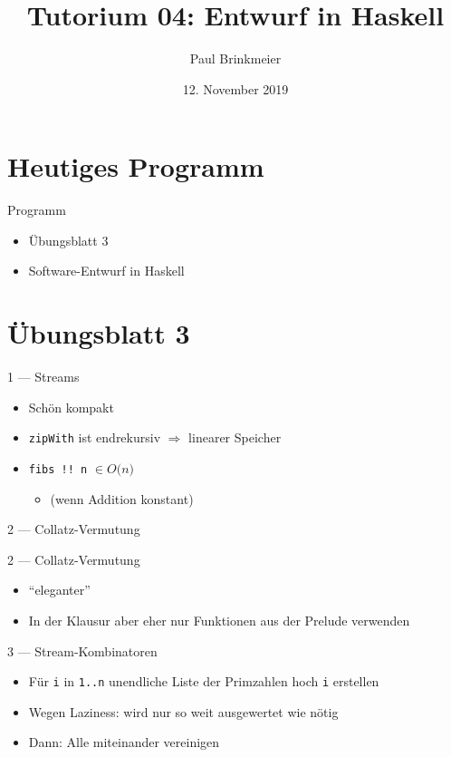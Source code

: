 \documentclass{beamer}
\title{Tutorium 04: Entwurf in Haskell}
\author{Paul Brinkmeier}
\institute{Tutorium Programmierparadigmen am KIT}
\date{12. November 2019}
\newcommand{\code}[1]{
	\begin{mdframed}
		
	\end{mdframed}
}
\begin{document}
\begin{frame}
	\titlepage
\end{frame}

\section{Heutiges Programm}
\begin{frame}{Programm}
	\begin{itemize}
		\item Übungsblatt 3
		\item Software-Entwurf in Haskell
	\end{itemize}
\end{frame}

\section{Übungsblatt 3}

\begin{frame}{1 --- Streams}
	\code{demos/Fibs.hs}

	\begin{itemize}
		\item Schön kompakt
		\item \texttt{zipWith} ist endrekursiv $\Rightarrow$ linearer Speicher 
		\item \texttt{fibs !! n} $\in O($\pause$n)$
		\begin{itemize}
			\item (wenn Addition konstant)
		\end{itemize}
	\end{itemize}
\end{frame}

\begin{frame}{2 --- Collatz-Vermutung}
	\code{demos/Collatz.hs}
\end{frame}

\begin{frame}{2 --- Collatz-Vermutung}
	\code{demos/CollatzAlt.hs}

	\begin{itemize}
		\item \enquote{eleganter}
		\item In der Klausur aber eher nur Funktionen aus der Prelude verwenden
	\end{itemize}
\end{frame}

\begin{frame}{3 --- Stream-Kombinatoren}
	\code{demos/Merge.hs}

	\begin{itemize}
		\item Für \texttt{i} in \texttt{1..n} unendliche Liste der Primzahlen hoch \texttt{i} erstellen
		\item Wegen Laziness: wird nur so weit ausgewertet wie nötig
		\item Dann: Alle miteinander vereinigen
	\end{itemize}
\end{frame}
\end{document}
